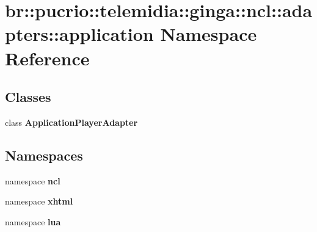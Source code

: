 \section{br::pucrio::telemidia::ginga::ncl::adapters::application Namespace Reference}
\label{namespacebr_1_1pucrio_1_1telemidia_1_1ginga_1_1ncl_1_1adapters_1_1application}


\subsection*{Classes}
\begin{CompactItemize}
\item 
class {\bf ApplicationPlayerAdapter}
\end{CompactItemize}
\subsection*{Namespaces}
\begin{CompactItemize}
\item 
namespace {\bf ncl}
\item 
namespace {\bf xhtml}
\item 
namespace {\bf lua}
\end{CompactItemize}
